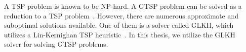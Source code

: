\documentclass[../main.tex]{subfiles}
\begin{document}
A TSP problem is known to be NP-hard. A GTSP problem can be solved as a reduction to a TSP problem~\cite{noon1993efficient}. However, there are numerous approximate and suboptimal solutions available. One of them is a solver called GLKH, which utilizes a Lin-Kernighan TSP heuristic~\cite{helsgaun2009general}. In this thesis, we utilize the GLKH solver for solving GTSP problems.





\end{document}
